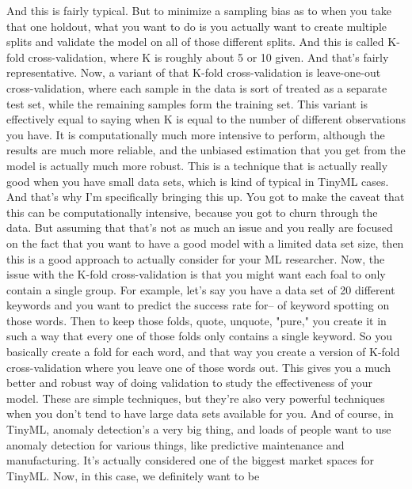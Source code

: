 {{    And this is fairly typical.
    But to minimize a sampling bias as to when
    you take that one holdout, what you want to do is you actually
    want to create multiple splits and validate the model
    on all of those different splits.
    And this is called K-fold cross-validation,
    where K is roughly about 5 or 10 given.
    And that's fairly representative.
    Now, a variant of that K-fold cross-validation
    is leave-one-out cross-validation, where each sample in the data
    is sort of treated as a separate test set,
    while the remaining samples form the training set.
    This variant is effectively equal to saying
    when K is equal to the number of different observations you have.
    It is computationally much more intensive to perform,
    although the results are much more reliable,
    and the unbiased estimation that you get from the model
    is actually much more robust.
    This is a technique that is actually really good
    when you have small data sets, which is kind of typical in TinyML cases.
    And that's why I'm specifically bringing this up.
    You got to make the caveat that this can be
    computationally intensive, because you got to churn through the data.
    But assuming that that's not as much an issue
    and you really are focused on the fact that you
    want to have a good model with a limited data set size,
    then this is a good approach to actually consider for your ML researcher.
    Now, the issue with the K-fold cross-validation
    is that you might want each foal to only contain a single group.
    For example, let's say you have a data set of 20 different keywords
    and you want to predict the success rate for--
    of keyword spotting on those words.
    Then to keep those folds, quote, unquote, "pure,"
    you create it in such a way that every one of those folds only
    contains a single keyword.
    So you basically create a fold for each word,
    and that way you create a version of K-fold cross-validation
    where you leave one of those words out.
    This gives you a much better and robust way
    of doing validation to study the effectiveness of your model.
    These are simple techniques, but they're also
    very powerful techniques when you don't tend to have large data
    sets available for you.
    And of course, in TinyML, anomaly detection's a very big thing,
    and loads of people want to use anomaly detection for various things,
    like predictive maintenance and manufacturing.
    It's actually considered one of the biggest market spaces for TinyML.
    Now, in this case, we definitely want to be
}}
